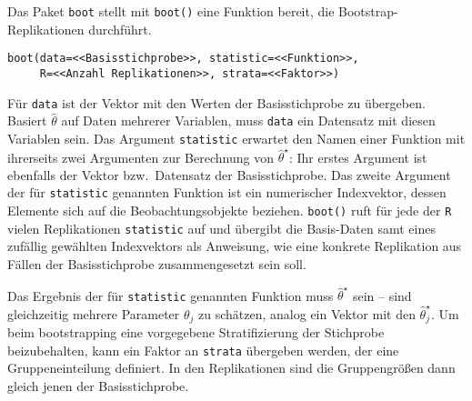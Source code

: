 Das Paket \lstinline!boot! stellt mit \lstinline!boot()! eine Funktion bereit, die Bootstrap-Replikationen durchführt.
\begin{lstlisting}
boot(data=<<Basisstichprobe>>, statistic=<<Funktion>>,
     R=<<Anzahl Replikationen>>, strata=<<Faktor>>)
\end{lstlisting}

Für \lstinline!data! ist der Vektor mit den Werten der Basisstichprobe zu übergeben. Basiert $\hat{\theta}$ auf Daten mehrerer Variablen, muss \lstinline!data! ein Datensatz mit diesen Variablen sein. Das Argument \lstinline!statistic! erwartet den Namen einer Funktion mit ihrerseits zwei Argumenten zur Berechnung von $\hat{\theta}^{\star}$: Ihr erstes Argument ist ebenfalls der Vektor bzw.\ Datensatz der Basisstichprobe. Das zweite Argument der für \lstinline!statistic! genannten Funktion ist ein numerischer Indexvektor, dessen Elemente sich auf die Beobachtungsobjekte beziehen. \lstinline!boot()! ruft für jede der \lstinline!R! vielen Replikationen \lstinline!statistic! auf und übergibt die Basis-Daten samt eines zufällig gewählten Indexvektors als Anweisung, wie eine konkrete Replikation aus Fällen der Basisstichprobe zusammengesetzt sein soll.

Das Ergebnis der für \lstinline!statistic! genannten Funktion muss $\hat{\theta}^{\star}$ sein -- sind gleichzeitig mehrere Parameter $\theta_{j}$ zu schätzen, analog ein Vektor mit den $\hat{\theta}^{\star}_{j}$. Um beim bootstrapping eine vorgegebene Stratifizierung der Stichprobe beizubehalten, kann ein Faktor an \lstinline!strata! übergeben werden, der eine Gruppeneinteilung definiert. In den Replikationen sind die Gruppengrößen dann gleich jenen der Basisstichprobe.

